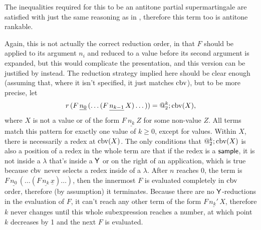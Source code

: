The inequalities required for this to be an antitone partial supermartingale are satisfied with just the same reasoning as in , therefore this term too is antitone rankable.

Again, this is not actually the correct reduction order, in that $F$ should be applied to its argument $n_i$ and reduced to a value before its second argument is expanded, 
but this would complicate the presentation, and this version can be justified by  instead. 
The reduction strategy implied here should be clear enough (assuming that, where it isn't specified, it just matches $\operatorname{cbv}$), but to be more precise, 
let 
\[
r \, (F \, \underline{n_0} \, (\dots(F\, \underline {n_{k-1}}\, X)\dots)) = @_2^k;\operatorname{cbv}(X),
\] 
where $X$ is not a value or of the form $F\ \underline{n_k}\ Z$ for some non-value $Z$. All terms match this pattern for exactly one value of $k \geq 0$, except for values. 
Within $X$, there is necessarily a redex at $\operatorname{cbv}(X)$. 
The only conditions that $@_2^k;\operatorname{cbv}(X)$ is also a position of a redex in the whole term are that if the redex is a $\mathsf{sample}$, 
it is not inside a $\lambda$ that's inside a $\mathsf{Y}$ or on the right of an application, which is true because $\operatorname{cbv}$ never selects a redex inside of a $\lambda$. 
After $n$ reaches $0$, the term is $F \, \underline{n_0} \, (\dots(F\, \underline {n_k} \, \underline x)\dots)$, then the innermost $F$ is evaluated completely in $\operatorname{cbv}$ order, therefore (by assumption) it terminates. 
Because there are no $\mathsf{Y}$-reductions in the evaluation of $F$, it can't reach any other term of the form $F\, \underline{n_k'}\, X$, 
therefore $k$ never changes until this whole subexpression reaches a number, at which point $k$ decreases by 1 and the next $F$ is evaluated.


\antitoneSeemsComplete*

